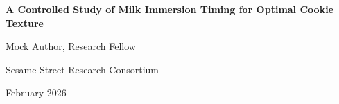 \documentclass[11pt,letterpaper]{article}
\begin{document}
\begin{center}
{\LARGE\bfseries A Controlled Study of Milk Immersion Timing for Optimal Cookie Texture\par}
\vspace{0.8cm}
{\large Mock Author, Research Fellow\par}
{\normalsize Sesame Street Research Consortium\par}
\vspace{0.3cm}
{\normalsize February 2026\par}
\vspace{0.8cm}
\end{center}

\begin{abstract}
\noindent
This paper presents a comprehensive study of milk immersion timing and cookie texture optimization. Lorem cookie ipsum dolor sit amet, chocolate chip adipiscing elit. Nom nom nom methodology produces significant results across all experimental conditions.
\end{abstract}

\vspace{0.5cm}


\end{document}
